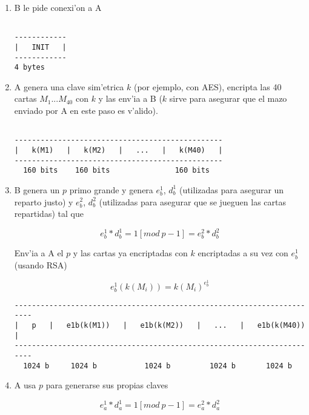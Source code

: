 \begin{enumerate}

\item B le pide conexi'on a A

\begin{verbatim}

------------
|   INIT   |
------------
4 bytes

\end{verbatim}




\item A genera una clave sim'etrica $k$ (por ejemplo, con AES), encripta las 40 cartas $M_1...M_40$ con $k$ y las env'ia a B ($k$ sirve para asegurar que el mazo enviado por A en este paso es v'alido).

\begin{verbatim}

------------------------------------------------
|   k(M1)   |   k(M2)   |   ...   |   k(M40)   |
------------------------------------------------
  160 bits    160 bits               160 bits

\end{verbatim}

  


\item B genera un $p$ primo grande y genera $e^1_b$, $d^1_b$ (utilizadas para asegurar un reparto justo) y  $e^2_b$, $d^2_b$ (utilizadas para asegurar que se jueguen las cartas repartidas) tal que

$$	e^1_b * d^1_b = 1 [mod\ p-1] = e^2_b * d^2_b $$

Env'ia a A el $p$ y las cartas ya encriptadas con $k$ encriptadas a su vez con $e^1_b$ (usando RSA)

$$	e^1_b(k(M_i)) = k(M_i)^{e^1_b} $$
	

\begin{verbatim}
-----------------------------------------------------------------------
|   p   |   e1b(k(M1))   |   e1b(k(M2))   |   ...   |   e1b(k(M40))   |
-----------------------------------------------------------------------
  1024 b     1024 b           1024 b         1024 b       1024 b       
\end{verbatim}


  


\item A usa $p$ para generarse sus propias claves

$$	e^1_a * d^1_a = 1 [mod\ p-1] = e^2_a * d^2_a $$


\end{enumerate}
